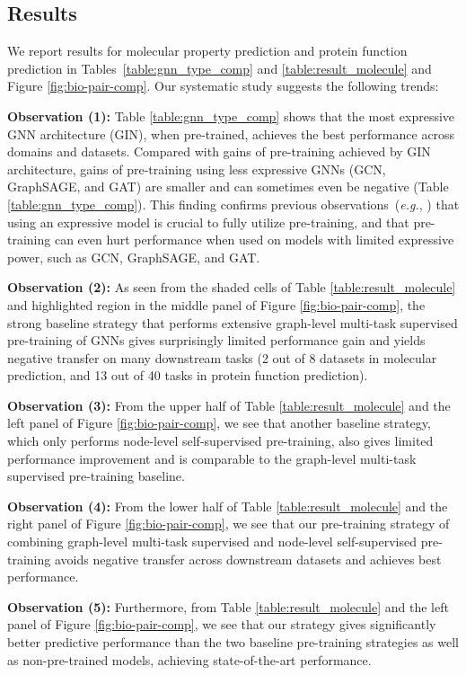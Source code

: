\documentclass{article} \usepackage{iclr2020_conference,times}
\numberwithin{equation}{section}
\theoremstyle{plain}
\theoremstyle{definition}
\theoremstyle{remark}
\newcommand{\eg}{\textit{e.g.}}
\begin{document}
\subsection{Results} 
We report results for molecular property prediction and protein function prediction in Tables~\ref{table:gnn_type_comp} and \ref{table:result_molecule} and Figure \ref{fig:bio-pair-comp}. Our systematic study suggests the following trends: 

{\bf Observation (1):} Table \ref{table:gnn_type_comp} shows that the most expressive GNN architecture (GIN), when pre-trained, achieves the best performance across domains and datasets. Compared with gains of pre-training achieved by GIN architecture, gains of pre-training using less expressive GNNs (GCN, GraphSAGE, and GAT) are smaller and can sometimes even be negative (Table \ref{table:gnn_type_comp}). This finding confirms previous observations~(\eg, \cite{erhan2010does}) that using an expressive model is crucial to fully utilize pre-training, and that pre-training can even hurt performance when used on models with limited expressive power, such as GCN, GraphSAGE, and GAT.

{\bf Observation (2):} As seen from the shaded cells of Table \ref{table:result_molecule} and highlighted region in the middle panel of Figure \ref{fig:bio-pair-comp}, the strong baseline strategy that performs extensive graph-level multi-task supervised pre-training of GNNs gives surprisingly limited performance gain and yields negative transfer on many downstream tasks (2 out of 8 datasets in molecular prediction, and 13 out of 40 tasks in protein function prediction). 

{\bf Observation (3):} From the upper half of Table \ref{table:result_molecule} and the left panel of Figure \ref{fig:bio-pair-comp}, we see that another baseline strategy, which only performs node-level self-supervised pre-training, also gives limited performance improvement and is comparable to the graph-level multi-task supervised pre-training baseline.

{\bf Observation (4):} From the lower half of Table \ref{table:result_molecule} and the right panel of Figure \ref{fig:bio-pair-comp}, we see that our pre-training strategy of combining graph-level multi-task supervised and node-level self-supervised pre-training avoids negative transfer across downstream datasets and achieves best performance. 

{\bf Observation (5):} Furthermore, from Table \ref{table:result_molecule} and the left panel of Figure \ref{fig:bio-pair-comp}, we see that our strategy gives significantly better predictive performance than the two baseline pre-training strategies as well as non-pre-trained models, achieving state-of-the-art performance. 
\end{document}
